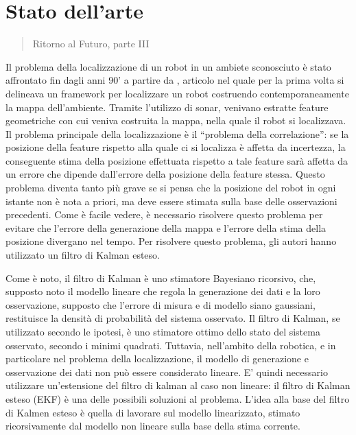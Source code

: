 \chapter{Stato dell'arte}
\label{capitolo2}
\thispagestyle{empty}

\begin{quotation}
{\footnotesize
{}
\begin{flushright}
Ritorno al Futuro, parte III
\end{flushright}
}
\end{quotation}
\vspace{0.5cm}

Il problema della localizzazione di un robot in un ambiete sconosciuto è stato affrontato fin dagli anni 90' a partire da \cite{174711}, articolo nel quale per la prima volta si delineava un framework per localizzare un robot costruendo contemporaneamente la mappa dell'ambiente.
Tramite l'utilizzo di sonar, venivano estratte feature geometriche con cui veniva costruita la mappa, nella quale il robot si localizzava. 
Il problema principale della localizzazione è il ``problema della correlazione'': se la posizione della feature rispetto alla quale ci si localizza è affetta da incertezza, la conseguente stima della posizione effettuata rispetto a tale feature sarà affetta da un errore che dipende dall'errore della posizione della feature stessa. 
Questo problema diventa tanto più grave se si pensa che la posizione del robot in ogni istante non è nota a priori, ma deve essere stimata sulla base delle osservazioni precedenti. 
Come è facile vedere, è necessario risolvere questo problema per evitare che l'errore della generazione della mappa e l'errore della stima della posizione divergano nel tempo. 
Per risolvere questo problema, gli autori hanno utilizzato un filtro di Kalman esteso.

Come è noto, il filtro di Kalman è uno stimatore Bayesiano ricorsivo, che, supposto noto il modello lineare che regola la generazione dei dati e la loro osservazione, supposto che l'errore di misura e di modello siano gaussiani, restituisce la densità di probabilità del sistema osservato. 
Il filtro di Kalman, se utilizzato secondo le ipotesi, è uno stimatore ottimo dello stato del sistema osservato, secondo i minimi quadrati.
Tuttavia, nell'ambito della robotica, e in particolare nel problema della localizzazione, il modello di generazione e osservazione dei dati non può essere considerato lineare.
E' quindi necessario utilizzare un'estensione del filtro di kalman al caso non lineare: il filtro di Kalman esteso (EKF) è una delle possibili soluzioni al problema. 
L'idea alla base del filtro di Kalmen esteso è quella di lavorare sul modello linearizzato, stimato ricorsivamente dal modello non lineare sulla base della stima corrente.


